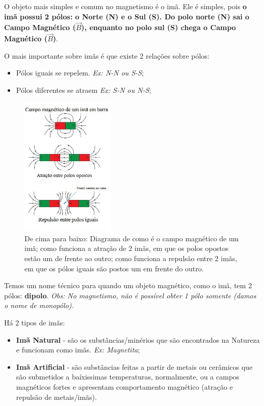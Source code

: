 \documentclass[12pt]{extarticle}
\newcommand{\<}{\langle}
\renewcommand{\>}{\rangle}
\theoremstyle{definition}
\begin{document}
O objeto mais simples e comum no magnetismo é o imã. Ele é simples, pois \textbf{o imã possui 2 pólos: o Norte (N) e o Sul (S). Do polo norte (N) sai o Campo Magnético ($\vec{B}$), enquanto no polo sul (S) chega o Campo Magnético ($\vec{B}$)}.

O mais importante sobre imãs é que existe 2 relações sobre pólos:
\begin{itemize}
    \item Pólos iguais se repelem. \textit{Ex: N-N ou S-S};
    \item Pólos diferentes se atraem \textit{Ex: S-N ou N-S};
\end{itemize}

\begin{figure}[h]
    \centering
    \includegraphics[width=0.4\textwidth]{atracao-repulsao-entre-polos.jpg}
    \caption{De cima para baixo: Diagrama de como é o campo magnético de um imã; como funciona a atração de 2 imãs, em que os polos opostos estão um de frente ao outro; como funciona a repulsão entre 2 imãs, em que os pólos iguais são postos um em frente do outro.}
    \label{fig:atra_repul_ima}
\end{figure}

Temos um nome técnico para quando um objeto magnético, como o imã, tem 2 pólos: \textbf{dipolo}. \textit{Obs: No magnetismo, não é possível obter 1 pólo somente (damos o nome de monopólo).}

Há 2 tipos de imãs:

\begin{itemize}
    \item \textbf{Imã Natural} - são os substâncias/minérios que são encontrados na Natureza e funcionam como imãs. \textit{Ex: Magnetita};
    \item \textbf{Imã Artificial} - são substâncias feitas a partir de metais ou cerâmicos que são submetidos a baíxissimas temperaturas, normalmente, ou a campos magnéticos fortes e apresentam comportamento magnético (atração e repulsão de metais/imãs).
\end{itemize}
\end{document}
